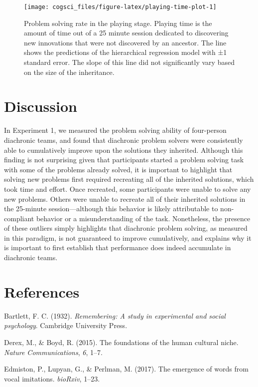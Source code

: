 \documentclass[10pt, letterpaper]{article}
\newenvironment{CodeChunk}{}{}
\begin{document}
\begin{CodeChunk}
\begin{figure}[tb]
\texttt{[image: cogsci\_files/figure-latex/playing-time-plot-1]} \caption[Problem solving rate in the playing stage]{Problem solving rate in the playing stage. Playing time is the amount of time out of a 25 minute session dedicated to discovering new innovations that were not discovered by an ancestor. The line shows the predictions of the hierarchical regression model with ±1 standard error. The slope of this line did not significantly vary based on the size of the inheritance.}\label{fig:playing-time-plot}
\end{figure}
\end{CodeChunk}

\hypertarget{discussion}{%
\section{Discussion}\label{discussion}}

In Experiment 1, we measured the problem solving ability of four-person
diachronic teams, and found that diachronic problem solvers were
consistently able to cumulatively improve upon the solutions they
inherited. Although this finding is not surprising given that
participants started a problem solving task with some of the problems
already solved, it is important to highlight that solving new problems
first required recreating all of the inherited solutions, which took
time and effort. Once recreated, some participants were unable to solve
any new problems. Others were unable to recreate all of their inherited
solutions in the 25-minute session---although this behavior is likely
attributable to non-compliant behavior or a misunderstanding of the
task. Nonetheless, the presence of these outliers simply highlights that
diachronic problem solving, as measured in this paradigm, is not
guaranteed to improve cumulatively, and explains why it is important to
first establish that performance does indeed accumulate in diachronic
teams.

\hypertarget{references}{%
\section{References}\label{references}}

\setlength{\parindent}{-0.1in} 
\setlength{\leftskip}{0.125in}

\noindent

\hypertarget{refs}{}
\leavevmode\hypertarget{ref-Bartlett:1933remembering}{}%
Bartlett, F. C. (1932). \emph{Remembering: A study in experimental and
social psychology}. Cambridge University Press.

\leavevmode\hypertarget{ref-Derex:2015cbb}{}%
Derex, M., \& Boyd, R. (2015). The foundations of the human cultural
niche. \emph{Nature Communications}, \emph{6}, 1--7.

\leavevmode\hypertarget{ref-Edmiston:2017jx}{}%
Edmiston, P., Lupyan, G., \& Perlman, M. (2017). The emergence of words
from vocal imitations. \emph{bioRxiv}, 1--23.
\end{document}

